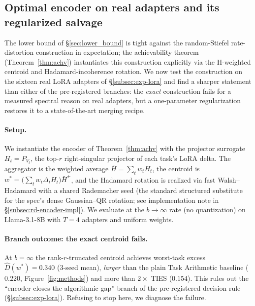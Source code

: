 
\subsection{Optimal encoder on real adapters and its regularized salvage}
\label{subsec:exp-rd-encoder}

The lower bound of \S\ref{sec:lower_bound} is tight against the
random-Stiefel rate-distortion construction in expectation; the
achievability theorem (Theorem~\ref{thm:achv}) instantiates
this construction explicitly via the H-weighted centroid and
Hadamard-incoherence rotation. We now test the construction on the
sixteen real LoRA adapters of \S\ref{subsec:exp-lora} and find a
sharper statement than either of the pre-registered branches: the
\emph{exact} construction fails for a measured spectral reason on
real adapters, but a one-parameter regularization restores it to a
state-of-the-art merging recipe.

\paragraph{Setup.} We instantiate the encoder of
Theorem~\ref{thm:achv} with the projector surrogate
$H_t = P_{V_t}$, the top-$r$ right-singular projector of each task's
LoRA delta. The aggregator is the weighted average
$\bar H = \sum_t w_t H_t$, the centroid is
$w^{*} = \big(\sum_t w_t \Delta_t H_t\big)\bar H^{+}$, and the
Hadamard rotation is realized via fast Walsh--Hadamard with a
shared Rademacher seed (the standard structured substitute for the
spec's dense Gaussian--QR rotation; see implementation note in
\S\ref{subsec:rd-encoder-impl}). We evaluate at the
$b \to \infty$ rate (no quantization) on Llama-3.1-8B with $T=4$
adapters and uniform weights.

\paragraph{Branch outcome: the exact centroid fails.}
At $b = \infty$ the rank-$r$-truncated centroid achieves worst-task
excess $\widehat D(w^{*}) = 0.340$ ($3$-seed mean), \emph{larger} than
the plain Task Arithmetic baseline ($0.220$, Figure~\ref{fig:methods})
and more than $2\times$ TIES ($0.154$). This rules out the
``encoder closes the algorithmic gap'' branch of the pre-registered
decision rule (\S\ref{subsec:exp-lora}). Refusing to stop here, we
diagnose the failure.

